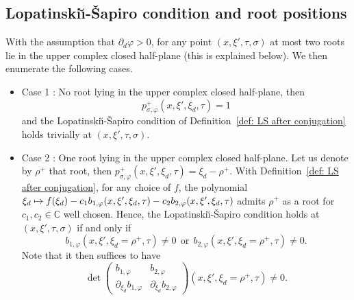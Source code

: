 \documentclass[10pt]{amsart}
\newcommand\mto{\mathchoice{\longmapsto}{\mapsto}{\mapsto}{\mapsto}}
\theoremstyle{plain}
\theoremstyle{definition}
\def\C{\mathbb{C}}
\newcommand{\LS}{Lopatinski\u{\i}-\v{S}apiro\xspace}
\newcommand{\pconj}{p_{\sigma,\varphi}}
\begin{document}
\subsection{Lopatinski\u{\i}-\v{S}apiro condition
and root positions}
\label{sec: discussion LS root positions}
With the assumption that $\partial_d\varphi>0$, for any point
$(x,\xi',\tau,\sigma)$ at most two roots lie in the upper complex closed half-plane (this is explained below). We then enumerate the following cases.
\begin{itemize}
\item
Case 1 : No root lying in the upper complex closed
half-plane, then
\[
\pconj^+ (x,\xi',\xi_d,\tau)=1
\]
and the
\LS condition of Definition~\ref{def: LS after conjugation} holds trivially at $(x,\xi',\tau,\sigma)$.

\item
Case 2 : One root lying in the upper complex closed
half-plane. Let us denote by $\rho^+$ that root, then
$\pconj^+ (x,\xi',\xi_d,\tau)=\xi_d-\rho^+$. With
Definition~\ref{def: LS after conjugation}, for any choice of $f$, the polynomial
$\xi_d\mto
f(\xi_d)-c_1b_{1,\varphi}(x,\xi',\xi_d,\tau)-c_2b_{2,\varphi}(x,\xi',\xi_d,\tau)$
admits $\rho^+$ as a root for $c_1,c_2\in\C$ well
chosen. Hence, the \LS condition holds at
$(x,\xi',\tau,\sigma)$ if and only\vspace*{-3pt}
if
\begin{equation*}
b_{1,\varphi}(x,\xi',\xi_d=\rho^+,\tau) \neq 0
\ \ \text{or} \ \
b_{2,\varphi}(x,\xi',\xi_d=\rho^+,\tau)\neq 0.
\end{equation*}
Note that it then suffices to have\vspace*{-3pt}
\begin{equation*}
\det
\begin{pmatrix}
b_{1,\varphi} &b_{2,\varphi}\\[
2pt]
\partial_{\xi_d}b_{1,\varphi}& \partial_{\xi_d}b_{2,\varphi}
\end{pmatrix}(x,\xi',\xi_d=\rho^+,\tau) \neq 0.
\end{equation*}


\end{itemize}
\end{document}
